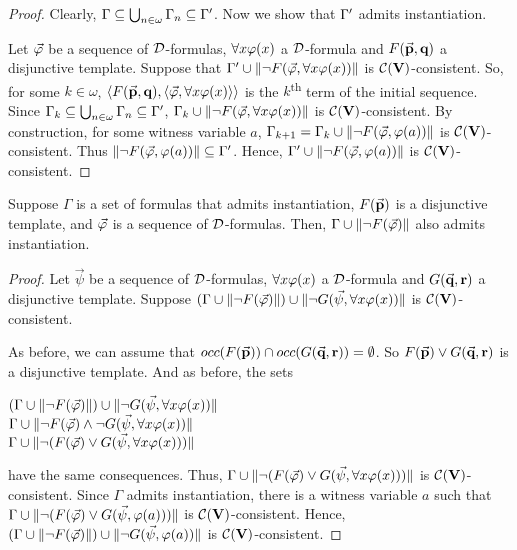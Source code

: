 \begin{proof}
	\qquad Clearly, $\Gamma\subseteq\bigcup_{n\in \omega} \Gamma_{n} \subseteq\Gamma^{\prime}$. Now we show that $\Gamma^{\prime}$ admits instantiation.
	
	
	\qquad Let $\vec{\varphi}$ be a sequence of $\mathcal{D}$-formulas, $\forall x \varphi (x)$ a $\mathcal{D}$-formula and $F(\vec{\textbf{p}},\textbf{q})$ a disjunctive template. Suppose that $\Gamma^{\prime} \cup  \Arrowvert \neg F(\vec{\varphi}, \forall x\varphi (x)) \Arrowvert$ is $\mathcal{C}(\textbf{V})$-consistent. So, for some $k \in \omega$, $\langle F(\vec{\textbf{p}},\textbf{q}) , \langle\vec{\varphi},\forall x \varphi (x)  \rangle\rangle$ is the $k$\textsuperscript{th} term of the initial sequence. Since $\Gamma_{k}\subseteq\bigcup_{n\in \omega} \Gamma_{n} \subseteq\Gamma^{\prime}$, $\Gamma_{k} \cup  \Arrowvert \neg F(\vec{\varphi}, \forall x\varphi (x)) \Arrowvert$ is $\mathcal{C}(\textbf{V})$-consistent. By construction, for some witness variable $a$, $\Gamma_{k+1}=\Gamma_{k} \cup  \Arrowvert \neg F(\vec{\varphi}, \varphi (a)) \Arrowvert$ is $\mathcal{C}(\textbf{V})$-consistent. Thus $\Arrowvert \neg F(\vec{\varphi}, \varphi (a)) \Arrowvert\subseteq \Gamma^{\prime}$. Hence, $\Gamma^{\prime} \cup \Arrowvert \neg F(\vec{\varphi}, \varphi (a)) \Arrowvert$ is $\mathcal{C}(\textbf{V})$-consistent. 
\end{proof}



\begin{lema}
	Suppose $\Gamma$ is a set of formulas that admits instantiation, $F(\vec{\textbf{p}})$ is a disjunctive template, and $\vec{\varphi}$ is a sequence of $\mathcal{D}$-formulas. Then, $\Gamma \cup \Arrowvert \neg F(\vec{\varphi}) \Arrowvert$ also admits instantiation.
\end{lema}

\begin{proof}
	Let $\vec{\psi}$ be a sequence of $\mathcal{D}$-formulas, $\forall x \varphi (x)$ a $\mathcal{D}$-formula and $G(\vec{\textbf{q}}, \textbf{r})$ a disjunctive template. Suppose $(\Gamma \cup \Arrowvert \neg F(\vec{\varphi}) \Arrowvert) \cup \Arrowvert \neg G(\vec{\psi}, \forall x \varphi (x)) \Arrowvert$ is $\mathcal{C}(\textbf{V})$-consistent.
	
	\qquad As before, we can assume that $occ(F(\vec{\textbf{p}})) \cap occ(G(\vec{\textbf{q}}, \textbf{r})) = \emptyset$. So $F(\vec{\textbf{p}}) \vee G(\vec{\textbf{q}}, \textbf{r})$ is a disjunctive template. And as before, the sets
	
	\begin{center}
		$(\Gamma \cup \Arrowvert \neg F(\vec{\varphi}) \Arrowvert) \cup \Arrowvert \neg G(\vec{\psi}, \forall x \varphi (x)) \Arrowvert$ \\
		$\Gamma \cup \Arrowvert \neg F(\vec{\varphi}) \wedge \neg G(\vec{\psi}, \forall x \varphi (x)) \Arrowvert$\\ 
		$\Gamma \cup \Arrowvert  \neg (F(\vec{\varphi}) \vee  G(\vec{\psi}, \forall x \varphi (x))) \Arrowvert$
	\end{center}
have the same consequences. Thus, $\Gamma \cup \Arrowvert  \neg (F(\vec{\varphi}) \vee  G(\vec{\psi}, \forall x \varphi (x))) \Arrowvert$ is $\mathcal{C}(\textbf{V})$-consistent. Since $\Gamma$ admits instantiation, there is a witness variable $a$ such that $\Gamma \cup \Arrowvert  \neg (F(\vec{\varphi}) \vee  G(\vec{\psi}, \varphi (a))) \Arrowvert$ is $\mathcal{C}(\textbf{V})$-consistent. Hence, $(\Gamma \cup \Arrowvert \neg F(\vec{\varphi}) \Arrowvert) \cup \Arrowvert \neg G(\vec{\psi},\varphi (a)) \Arrowvert$ is $\mathcal{C}(\textbf{V})$-consistent.
\end{proof}




